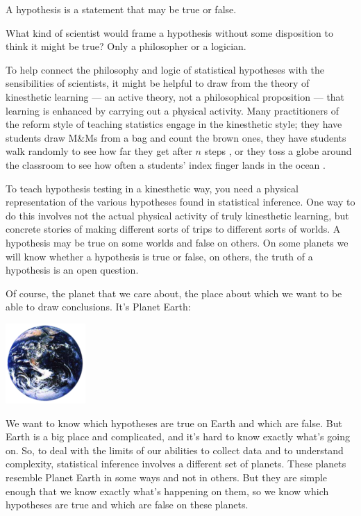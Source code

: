 \begin{center}
A hypothesis is a statement that may be true or false.
\end{center}

What kind of scientist would frame a hypothesis without some disposition to
think it might be true?  Only a philosopher or a logician.
%

To help connect the philosophy and logic of statistical hypotheses
with the sensibilities of scientists, 
it might be helpful to draw from the theory of kinesthetic learning
--- an active theory, not a philosophical proposition --- that learning is enhanced by
carrying out a physical activity.
Many practitioners of the reform style of teaching statistics engage
in the kinesthetic style; they have students draw M\&Ms from a bag
and count the brown ones, they have students walk randomly to see how
far they get after $n$ steps \cite{kaplan-2009-book}, or they toss a globe around the classroom
to see how often a students' index finger lands in the ocean \cite{gelm:nola:2002}.

To teach hypothesis testing in a kinesthetic way, you need a physical
representation of the various hypotheses found in statistical
inference.  One way to do this involves not the actual physical
activity of truly kinesthetic learning, but concrete stories of making
different sorts of trips to different sorts of worlds.  
A hypothesis may be true on some worlds and false on others.
On some planets we will know whether a hypothesis is true or false,
on others, the truth of a hypothesis is an open question.

Of course, the planet that we care about, the place about which we
want to be able to draw conclusions.  It's Planet Earth:

\centerline{\includegraphics[width=1.2in]{images/planet_earth.png}}

We want to know which hypotheses are true on Earth and which are false.
But Earth is a big place and complicated,
and it's hard to know exactly what's going on.  So, to
deal with the limits of our abilities to collect data and to
understand complexity, statistical inference involves a different set
of planets.  These planets resemble Planet Earth in some ways and not in others.  
But they are simple enough that we know exactly what's happening on them, 
so we know which hypotheses are true and which are false on these planets.

